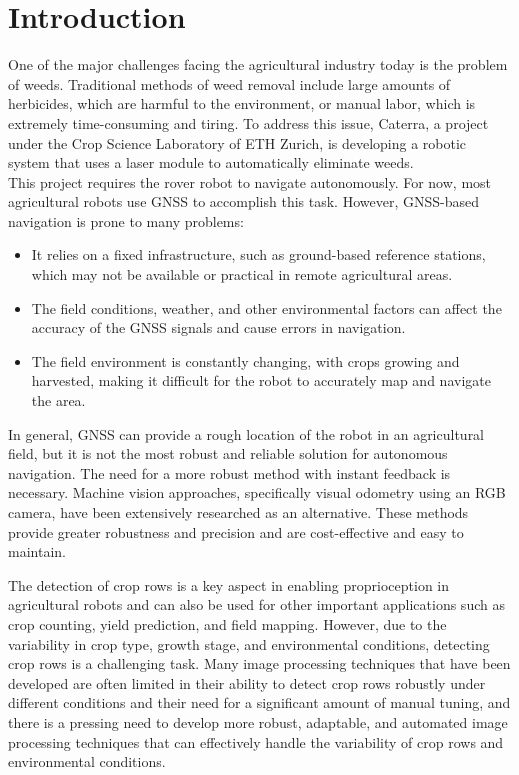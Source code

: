 \chapter{Introduction}
\label{sec:introduction}

 One of the major challenges facing the agricultural industry today is the problem of weeds. Traditional methods of weed removal include large amounts of herbicides, which are harmful to the environment, or manual labor, which is extremely time-consuming and tiring. To address this issue, Caterra, a project under the Crop Science Laboratory of ETH Zurich, is developing a robotic system that uses a laser module to automatically eliminate weeds. \\

This project requires the rover robot to navigate autonomously. For now, most agricultural robots use GNSS to accomplish this task. However, GNSS-based navigation is prone to many problems:
\begin{itemize}
    \item It relies on a fixed infrastructure, such as ground-based reference stations, which may not be available or practical in remote agricultural areas.
    \item The field conditions, weather, and other environmental factors can affect the accuracy of the GNSS signals and cause errors in navigation.
    \item The field environment is constantly changing, with crops growing and harvested, making it difficult for the robot to accurately map and navigate the area.
\end{itemize}

In general, GNSS can provide a rough location of the robot in an agricultural field, but it is not the most robust and reliable solution for autonomous navigation. The need for a more robust method with instant feedback is necessary. Machine vision approaches, specifically visual odometry using an RGB camera, have been extensively researched as an alternative. These methods provide greater robustness and precision and are cost-effective and easy to maintain.

The detection of crop rows is a key aspect in enabling proprioception in agricultural robots and can also be used for other important applications such as crop counting, yield prediction, and field mapping. However, due to the variability in crop type, growth stage, and environmental conditions, detecting crop rows is a challenging task. Many image processing techniques that have been developed are often limited in their ability to detect crop rows robustly under different conditions and their need for a significant amount of manual tuning, and there is a pressing need to develop more robust, adaptable, and automated image processing techniques that can effectively handle the variability of crop rows and environmental conditions. \\


